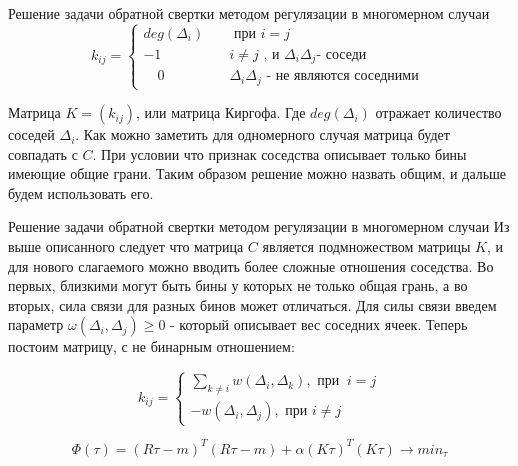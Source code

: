 \documentclass[fullscreen=true,russian,compress,%
	hyperref={unicode,bookmarks=false}]{presentation}
\begin{document}
\begin{frame}{Решение задачи обратной свертки методом регулязации в многомерном случаи}
   \begin{equation}
      k_{ij} =
       \begin{cases}
         deg(\Delta_{i}) & \quad \text{ при } i = j \\
          -1              & \quad i \neq j  \text{ , и } \Delta_{i} \Delta_{j} \text{- соседи } \\
     \quad 0               & \quad \Delta_{i} \Delta_{j} \text{ - не являются соседними }
       \end{cases}
     \end{equation}
     
     Матрица $K = (k_{ij})$, или матрица Киргофа. Где $deg(\Delta_{i})$ отражает количество соседей $\Delta_{i}$. 
     Как можно заметить для одномерного случая матрица будет совпадать 
     с $C$. При условии что признак соседства описывает только бины имеющие общие грани. 
     Таким образом решение можно назвать общим, и дальше будем использовать его.
\end{frame}


\begin{frame}{Решение задачи обратной свертки методом регулязации в многомерном случаи}
   Из выше описанного следует что матрица $C$ является подмножеством матрицы $K$, и для нового слагаемого можно вводить более сложные
   отношения соседства. Во первых, близкими могут быть бины у которых не только общая грань, а во вторых, сила связи для разных бинов
   может отличаться. Для силы связи введем параметр $\omega(\Delta_{i}, \Delta_{j}) \geq 0$ - который описывает вес соседних ячеек. 
   Теперь постоим матрицу, с не бинарным отношением:
   
   \begin{equation}
    k_{ij} =
     \begin{cases}
       \displaystyle\sum_{k\neq i} w(\Delta_{i}, \Delta_{k}), \text{ при } \ i = j \\
       -w( \Delta_{i}, \Delta_{j} ), \text{ при } i \neq j
     \end{cases}
   \end{equation}

   \begin{equation}
      \Phi(\tau)=(R\tau-m)^T (R\tau-m) + \alpha(K\tau)^T(K\tau) \to min_{\tau}
      \label{min_n_dim}
   \end{equation}
\end{frame}
\end{document}

